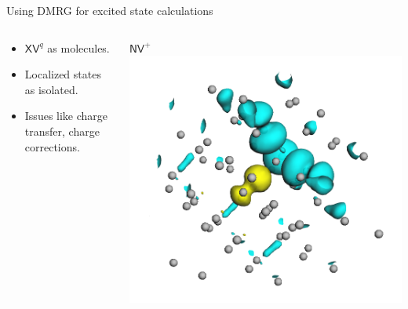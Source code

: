 \documentclass[notes=show]{beamer}
\begin{document}
\begin{frame}{Using DMRG for excited state calculations}
  \begin{columns}
    \begin{column}{0.5\textwidth}
      \begin{itemize}
        \item $ \mathsf{XV}^{q} $ as molecules.
        \item Localized states as isolated.
        \item Issues like charge transfer, charge corrections.
      \end{itemize}
    \end{column}
    \begin{column}{0.5\textwidth}
      \centering
      \textit{ $ \mathsf{NV}^{+} $ }
      \includegraphics[clip, trim=2cm 0 2cm 0, width=1.0\textwidth]{images/nv_plus_orbitals_example.png}
    \end{column}
  \end{columns}
\end{frame}


\end{document}
